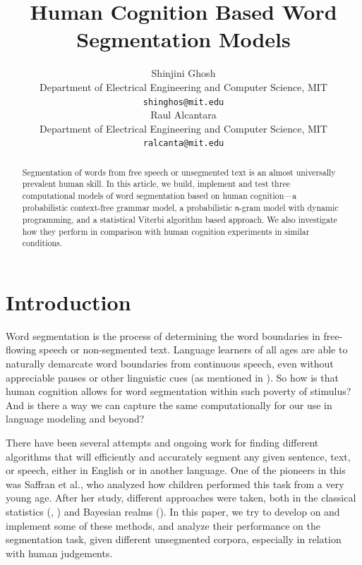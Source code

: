 \documentclass{article}
\title{Human Cognition Based Word Segmentation Models}
\author{
  Shinjini Ghosh \\
  Department of Electrical Engineering and Computer Science, MIT \\
  \texttt{shinghos@mit.edu} \\
  \And
  Raul Alcantara \\
  Department of Electrical Engineering and Computer Science, MIT \\
  \texttt{ralcanta@mit.edu} \\
}
\begin{document}
\maketitle

\begin{abstract}
    Segmentation of words from free speech or unsegmented text is an almost universally prevalent human skill. In this article, we build, implement and test three computational models of word segmentation based on human cognition---a probabilistic context-free grammar model, a probabilistic \texttt{n}-gram model with dynamic programming, and a statistical Viterbi algorithm based approach. We also investigate how they perform in comparison with human cognition experiments in similar conditions.
\end{abstract}

\section{Introduction}

Word segmentation is the process of determining the word boundaries in free-flowing speech or non-segmented text. Language learners of all ages are able to naturally demarcate word boundaries from continuous speech, even without appreciable pauses or other linguistic cues (as mentioned in \citet{Saffran1996}). So how is that human cognition allows for word segmentation within such poverty of stimulus? And is there a way we can capture the same computationally for our use in language modeling and beyond?

There have been several attempts and ongoing work for finding different algorithms that will efficiently and accurately segment any given sentence, text, or speech, either in English or in another language. One of the pioneers in this was Saffran et al., who analyzed how children performed this task from a very young age. After her study, different approaches were taken, both in the classical statistics (\citet{Brent}, \citet{Venkataraman}) and Bayesian realms (\citet{GOLDWATER200921}). In this paper, we try to develop on and implement some of these methods, and analyze their performance on the segmentation task, given different unsegmented corpora, especially in relation with human judgements.
\end{document}
